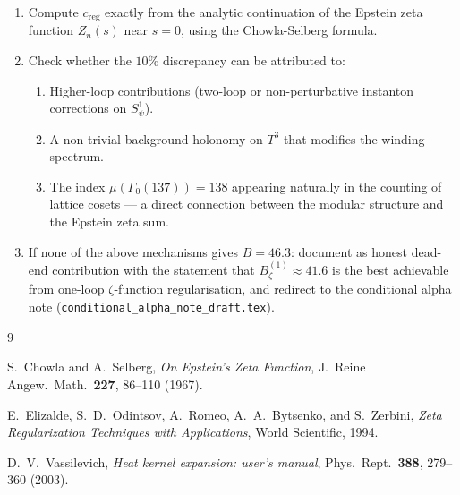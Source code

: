 \documentclass[12pt,a4paper]{article}
\theoremstyle{definition}
\theoremstyle{remark}
\begin{document}
\begin{enumerate}
  \item Compute $c_{\mathrm{reg}}$ exactly from the analytic continuation of
        the Epstein zeta function $Z_n(s)$ near $s = 0$, using the
        Chowla-Selberg formula.

  \item Check whether the $10\%$ discrepancy can be attributed to:
        \begin{enumerate}
          \item Higher-loop contributions (two-loop or non-perturbative
                instanton corrections on $S^1_\psi$).
          \item A non-trivial background holonomy on $T^3$ that modifies
                the winding spectrum.
          \item The index $\mu(\Gamma_0(137)) = 138$ appearing naturally in
                the counting of lattice cosets — a direct connection between
                the modular structure and the Epstein zeta sum.
        \end{enumerate}

  \item If none of the above mechanisms gives $B = 46.3$: document as
        honest dead-end contribution with the statement that
        $B_\zeta^{(1)} \approx 41.6$ is the best achievable from one-loop
        $\zeta$-function regularisation, and redirect to the conditional
        alpha note (\texttt{conditional\_alpha\_note\_draft.tex}).
\end{enumerate}

\begin{thebibliography}{9}

S.~Chowla and A.~Selberg,
\emph{On Epstein's Zeta Function},
J.~Reine Angew.~Math.\ \textbf{227}, 86--110 (1967).

E.~Elizalde, S.~D.~Odintsov, A.~Romeo, A.~A.~Bytsenko, and S.~Zerbini,
\emph{Zeta Regularization Techniques with Applications},
World Scientific, 1994.

D.~V.~Vassilevich,
\emph{Heat kernel expansion: user's manual},
Phys.\ Rept.\ \textbf{388}, 279--360 (2003).

\end{thebibliography}
\end{document}
